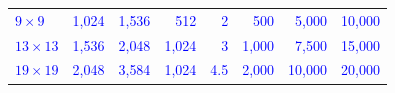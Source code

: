 \begin{table}[t]
\begin{tabular*}{\textwidth}{@{\extracolsep{\fill}}lrrrrrrr@{}}
\textcolor{blue}{$9\times9$} & \textcolor{blue}{1{,}024} & \textcolor{blue}{1{,}536} & \textcolor{blue}{512} & \textcolor{blue}{2} & \textcolor{blue}{500} & \textcolor{blue}{5{,}000} & \textcolor{blue}{10{,}000} \\
\textcolor{blue}{$13\times13$} & \textcolor{blue}{1{,}536} & \textcolor{blue}{2{,}048} & \textcolor{blue}{1{,}024} & \textcolor{blue}{3} & \textcolor{blue}{1{,}000} & \textcolor{blue}{7{,}500} & \textcolor{blue}{15{,}000} \\
\textcolor{blue}{$19\times19$} & \textcolor{blue}{2{,}048} & \textcolor{blue}{3{,}584} & \textcolor{blue}{1{,}024} & \textcolor{blue}{4.5} & \textcolor{blue}{2{,}000} & \textcolor{blue}{10{,}000} & \textcolor{blue}{20{,}000} \\
\bottomrule
\end{tabular*}
\end{table}
